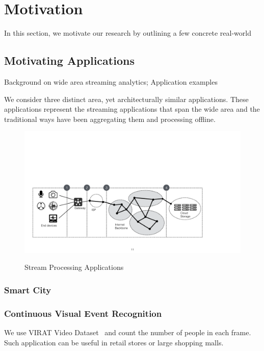 \section{Motivation}
\label{sec:motivation}

In this section, we motivate our research by outlining a few concrete real-world

\subsection{Motivating Applications}
\label{sec:motiv-appl}

Background on wide area streaming analytics; Application examples

We consider three distinct area, yet architecturally similar applications. These
applications represent the streaming applications that span the wide area and
the traditional ways have been aggregating them and processing offline.

\begin{figure}
  \centering
  \includegraphics[width=.95\linewidth]{figures/model.pdf}
  \label{fig:app-model}
  \caption{Stream Processing Applications}
\end{figure}

\subsubsection{Smart City}
\label{sec:smart-city}


\subsubsection{Continuous Visual Event Recognition}
\label{sec:cont-visu-event}

We use VIRAT Video Dataset~\cite{oh2011large} and count the number of people in
each frame. Such application can be useful in retail stores or large shopping
malls.


